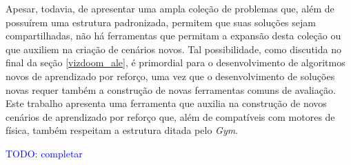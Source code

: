 \documentclass[cic,tc]{iiufrgs}
\newcommand\henrique[1]{\textcolor{blue}{#1}}
\begin{document}
Apesar, todavia, de apresentar uma ampla coleção de problemas que, além de
possuírem uma estrutura padronizada, permitem que suas soluções sejam
compartilhadas, não há ferramentas que permitam a expansão desta coleção ou que
auxiliem na criação de cenários novos. Tal possibilidade, como discutida no
final da seção \ref{vizdoom_ale}, é primordial para o desenvolvimento de
algoritmos novos de aprendizado por reforço, uma vez que o desenvolvimento de
soluções novas requer também a construção de novas ferramentas comuns de
avaliação. Este trabalho apresenta uma ferramenta que auxilia na construção de
novos cenários de aprendizado por reforço que, além de compatíveis com motores
de física, também respeitam a estrutura ditada pelo \textit{Gym}.


\henrique{TODO: completar}
%
%
%
%
%
\end{document}
